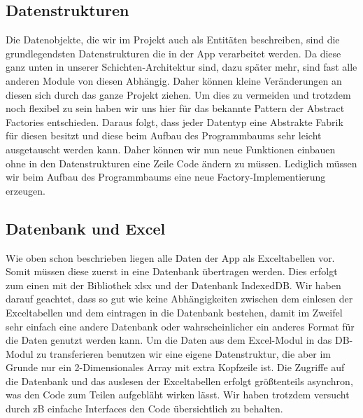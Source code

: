 \subsection{Datenstrukturen}
Die Datenobjekte, die wir im Projekt auch als Entitäten beschreiben, sind die grundlegendsten Datenstrukturen die in der App verarbeitet werden. Da diese ganz unten in unserer Schichten-Architektur sind, dazu später mehr, sind fast alle anderen Module von diesen Abhängig. Daher können kleine Veränderungen an diesen sich durch das ganze Projekt ziehen. Um dies zu vermeiden und trotzdem noch flexibel zu sein haben wir uns hier für das bekannte Pattern der Abstract Factories entschieden. Daraus folgt, dass jeder Datentyp eine Abstrakte Fabrik für diesen besitzt und diese beim Aufbau des Programmbaums sehr leicht ausgetauscht werden kann. Daher können wir nun neue Funktionen einbauen ohne in den Datenstrukturen eine Zeile Code ändern zu müssen. Lediglich müssen wir beim Aufbau des Programmbaums eine neue Factory-Implementierung erzeugen. 

\subsection{Datenbank und Excel}
Wie oben schon beschrieben liegen alle Daten der App als Exceltabellen vor. Somit müssen diese zuerst in eine Datenbank übertragen werden. Dies erfolgt zum einen mit der Bibliothek xlsx und der Datenbank IndexedDB. Wir haben darauf geachtet, dass so gut wie keine Abhängigkeiten zwischen dem einlesen der Exceltabellen und dem eintragen in die Datenbank bestehen, damit im Zweifel sehr einfach eine andere Datenbank oder wahrscheinlicher ein anderes Format für die Daten genutzt werden kann. Um die Daten aus dem Excel-Modul in das DB-Modul zu transferieren benutzen wir eine eigene Datenstruktur, die aber im Grunde nur ein 2-Dimensionales Array mit extra Kopfzeile ist. Die Zugriffe auf die Datenbank und das auslesen der Exceltabellen erfolgt größtenteils asynchron, was den Code zum Teilen aufgebläht wirken lässt. Wir haben trotzdem versucht durch zB einfache Interfaces den  Code übersichtlich zu behalten.

